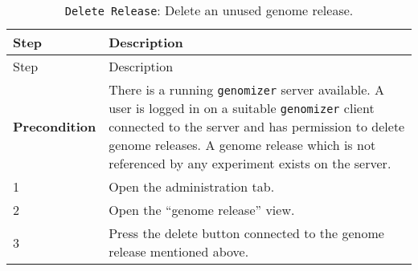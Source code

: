 \begin{longtable}[c]{@{}ll@{}}
\caption{\texttt{Delete\ Release}: Delete an unused genome
release.}\tabularnewline
\toprule
\begin{minipage}[b]{0.31\columnwidth}\raggedright\strut
Step
\strut\end{minipage} &
\begin{minipage}[b]{0.63\columnwidth}\raggedright\strut
Description
\strut\end{minipage}\tabularnewline
\midrule
\endfirsthead
\toprule
\begin{minipage}[b]{0.31\columnwidth}\raggedright\strut
Step
\strut\end{minipage} &
\begin{minipage}[b]{0.63\columnwidth}\raggedright\strut
Description
\strut\end{minipage}\tabularnewline
\midrule
\endhead
\begin{minipage}[t]{0.31\columnwidth}\raggedright\strut
\textbf{Precondition}
\strut\end{minipage} &
\begin{minipage}[t]{0.63\columnwidth}\raggedright\strut
There is a running \texttt{genomizer} server available. A user is logged
in on a suitable \texttt{genomizer} client connected to the server and
has permission to delete genome releases. A genome release which is not
referenced by any experiment exists on the server.
\strut\end{minipage}\tabularnewline
\begin{minipage}[t]{0.31\columnwidth}\raggedright\strut
1
\strut\end{minipage} &
\begin{minipage}[t]{0.63\columnwidth}\raggedright\strut
Open the administration tab.
\strut\end{minipage}\tabularnewline
\begin{minipage}[t]{0.31\columnwidth}\raggedright\strut
2
\strut\end{minipage} &
\begin{minipage}[t]{0.63\columnwidth}\raggedright\strut
Open the ``genome release'' view.
\strut\end{minipage}\tabularnewline
\begin{minipage}[t]{0.31\columnwidth}\raggedright\strut
3
\strut\end{minipage} &
\begin{minipage}[t]{0.63\columnwidth}\raggedright\strut
Press the delete button connected to the genome release mentioned above.
\strut\end{minipage}\tabularnewline

\end{longtable}
